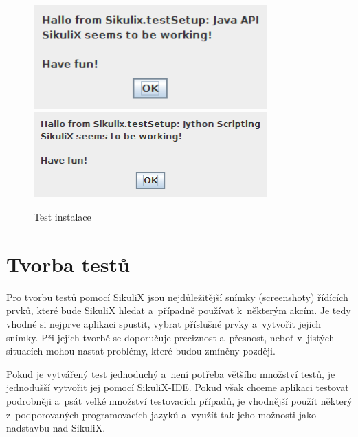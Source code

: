 	\begin{figure}[ht!]
		\centering
		\includegraphics[width=9cm]{img/Instalace/InstalaceOK.png}\\[0.3cm]
		\includegraphics[width=9cm]{img/Instalace/InstalaceOK1.png}
		\caption{Test instalace}
		\label{InstalOK}
	\end{figure}
	
	\section{Tvorba testů}
	Pro tvorbu testů pomocí SikuliX jsou nejdůležitější snímky (screenshoty) řídících prvků, které bude SikuliX hledat a~případně používat k~některým akcím. Je tedy vhodné si nejprve aplikaci spustit, vybrat příslušné prvky a~vytvořit jejich snímky. Při jejich tvorbě se doporučuje preciznost a~přesnost, neboť v~jistých situacích mohou nastat problémy, které budou zmíněny později.
	
	Pokud je vytvářený test jednoduchý a~není potřeba většího množství testů, je jednodušší vytvořit jej pomocí SikuliX-IDE. Pokud však chceme aplikaci testovat podrobněji a~psát velké množství testovacích případů, je vhodnější použít některý z~podporovaných programovacích jazyků a~využít tak jeho možnosti jako nadstavbu nad SikuliX.
	

